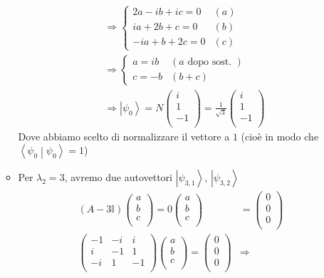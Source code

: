 \begin{enumerate}
\begin{itemize}
\begin{align*}
	&\Rightarrow
	\begin{cases}
	2a-ib+ic=0 & (a)\\
	ia+2b+c=0 & (b)\\
	-ia+b+2c=0 & (c)
	\end{cases}\\
	&\Rightarrow 
	\begin{cases}
	a=ib & (a \text{ dopo sost. })\\
	c=-b & (b+c)
	\end{cases}\\
	&\Rightarrow \left|\psi_0\right\rangle=N\left(\begin{matrix}i\\1\\-1\\\end{matrix}\right)=\frac{1}{\sqrt3}\left(\begin{matrix}i\\1\\-1\\\end{matrix}\right)
	\end{align*}
	Dove abbiamo scelto di normalizzare il vettore a $1$ (cioè in modo che  $\left\langle\psi_0\middle|\psi_0\right\rangle=1$)
	\item Per $\lambda_2=3$, avremo due autovettori $\left|\psi_{3,1}\right\rangle$, $\left|\psi_{3,2}\right\rangle$
	\begin{align*}
	\left(A-3\mathbb{I}\right)\left(\begin{matrix}a\\b\\c\\\end{matrix}\right)=0\left(\begin{matrix}a\\b\\c\\\end{matrix}\right)&=\left(\begin{matrix}0\\0\\0\\\end{matrix}\right)\\
	\left(\begin{matrix}-1&-i&i\\i&-1&1\\-i&1&-1\\\end{matrix}\right)\left(\begin{matrix}a\\b\\c\\\end{matrix}\right)=\left(\begin{matrix}0\\0\\0\\\end{matrix}\right)& \Rightarrow 

\end{align*}
\end{itemize}
\end{enumerate}
